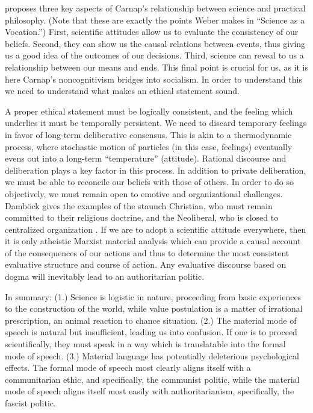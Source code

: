 \documentclass[leqno, 12pt]{turabian-researchpaper}
\begin{document}
	\autocite{dambock2022a} proposes three key aspects of Carnap's relationship
	between science and practical philosophy. (Note that these are exactly the
	points Weber makes in \enquote{Science as a Vocation.}) First, scientific attitudes
	allow us to evaluate the consistency of our beliefs. Second, they can show us the
	causal relations between events, thus giving us a good idea of the outcomes of
	our decisions. Third, science can reveal to us a relationship between our
	means and ends. This final point is crucial for us, as it is here Carnap's
	noncognitivism bridges into socialism. In order to understand this we need to understand
	what makes an ethical statement sound.

	A proper ethical statement must be logically consistent, and the feeling which
	underlies it must be temporally persistent. We need to discard temporary feelings
	in favor of long-term deliberative consensus. This is akin to a thermodynamic
	process, where stochastic motion of particles (in this case, feelings)
	eventually evens out into a long-term \enquote{temperature} (attitude).
	Rational discourse and deliberation plays a key factor in this process. In addition
	to private deliberation, we must be able to reconcile our beliefs with those
	of others. In order to do so objectively, we must remain open to emotive and
	organizational challenges. Damb\"ock gives the examples of the staunch Christian,
	who must remain committed to their religious doctrine, and the Neoliberal, who
	is closed to centralized organization \autocite[p515]{dambock2022a}. If we are
	to adopt a scientific attitude everywhere, then it is only atheistic Marxist
	material analysis which can provide a causal account of the consequences of
	our actions and thus to determine the most consistent evaluative structure and
	course of action. Any evaluative discourse based on dogma will inevitably lead
	to an authoritarian politic.

	In summary: (1.) Science is logistic in nature, proceeding from basic experiences
	to the construction of the world, while value postulation is a matter of
	irrational prescription, an animal reaction to chance situation. (2.) The
	material mode of speech is natural but insufficient, leading us into confusion.
	If one is to proceed scientifically, they must speak in a way which is translatable
	into the formal mode of speech. (3.) Material language has potentially
	deleterious psychological effects. The formal mode of speech most clearly aligns
	itself with a communitarian ethic, and specifically, the communist politic,
	while the material mode of speech aligns itself most easily with
	authoritarianism, specifically, the fascist politic.
\end{document}
